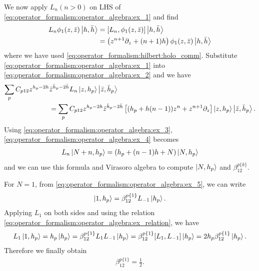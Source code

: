 \documentclass[10pt]{article}
\begin{document}
\begin{example}
    We now apply $L_n (n>0)$ on LHS of \cref{eq:operator_formalism:operator_algebra:ex_1} and find 
    \begin{align}
        L_n\phi_1(z,\bar{z})\ket{h,\bar{h}} & =\comm{L_n}{\phi_1(z,\bar{z})}\ket{h,\bar{h}}\notag                                                                       \\
                                            & =\left(z^{n+1}\partial_z+(n+1)h\right)\phi_1(z,\bar{z})\ket{h,\bar{h}}\label{eq:operator_formalism:operator_algebra:ex_2}
    \end{align}
    where we have used \cref{eq:operator_formalism:hilbert:holo_comm}. 
    Substitute \cref{eq:operator_formalism:operator_algebra:ex_1} into \cref{eq:operator_formalism:operator_algebra:ex_2} and we have 
    \begin{align}
        \sum_p C_{p12}z^{h_p-2h} & \bar{z}^{\bar{h}_p-2\bar{h}}L_n\ket{z,h_p}\ket{\bar{z},\bar{h}_p}\notag                                                                                                                   \\
                                 & =\sum_p C_{p12}z^{h_p-2h}\bar{z}^{\bar{h}_p-2\bar{h}}\left[(h_p+h(n-1))z^n+z^{n+1}\partial_z\right]\ket{z,h_p}\ket{\bar{z},\bar{h}_p}.\label{eq:operator_formalism:operator_algebra:ex_4}
    \end{align}
    Using \cref{eq:operator_formalism:operator_algebra:ex_3}, \cref{eq:operator_formalism:operator_algebra:ex_4} becomes 
    \begin{align}
        L_n\ket{N+n,h_p}=\left(h_p+(n-1)h+N\right)\ket{N,h_p}\label{eq:operator_formalism:operator_algebra:ex_relation}
    \end{align}
    and we can use this formula and Virasoro algebra to compute $\ket{N,h_p}$ and $\beta^{p\{k\}}_{12}$.
    
    For $N=1$, from \cref{eq:operator_formalism:operator_algebra:ex_5}, we can write 
    \begin{align}
        \ket{1,h_p}=\beta^{p\{1\}}_{12}L_{-1}\ket{h_p}.
    \end{align}
    Applying $L_1$ on both sides and using the relation \cref{eq:operator_formalism:operator_algebra:ex_relation}, we have 
    \begin{align}
        L_1\ket{1,h_p}=h_p\ket{h_p}=\beta^{p\{1\}}_{12}L_1 L_{-1}\ket{h_p}=\beta^{p\{1\}}_{12}\comm{L_1}{L_{-1}}\ket{h_p}=2h_{p}\beta^{p\{1\}}_{12}\ket{h_p}.
    \end{align}
    Therefore we finally obtain 
    \begin{align}
        \beta^{p\{1\}}_{12}=\frac{1}{2}.
    \end{align}
    

\end{example}
\end{document}
